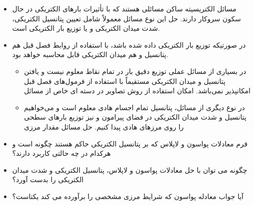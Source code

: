 \ELhold


\begin{ELunit}


\end{ELunit}

\ELhold


\begin{ELunit}

\begin{itemize}
\tightlist
\item
  مسائل الکتریسیته ساکن مسائلی هستند که با تأثیرات بارهای الکتریکی در حال سکون سروکار دارند. حل این نوع مسائل معمولاً شامل تعیین پتانسیل الکتریکی، شدت میدان الکتریکی و یا توزیع بار الکتریکی است.
\item
  در صورتیکه توزیع بار الکتریکی داده شده باشد، با استفاده از روابط فصل قبل هم پتانسیل و هم میدان الکتریکی قابل محاسبه خواهد بود.

  \begin{itemize}
  \tightlist
  \item
    در بسیاری از مسائل عملی توزیع دقیق بار در تمام نقاط معلوم نیست و یافتن پتانسیل و میدان الکتریکی مستقیماً با استفاده از فرمول‌های فصل قبل امکانپذیر نمی‌باشد. \ELim{\ELto} امکان استفاده از روش تصاویر در دسته ای خاص از مسائل
  \item
    در نوع دیگری از مسائل، پتانسیل تمام اجسام هادی معلوم است و می‌خواهیم پتانسیل و شدت میدان الکتریکی در فضای پیرامون و نیز توزیع بارهای سطحی را روی مرزهای هادی پیدا کنیم. \ELim{\ELto} حل مسائل مقدار مرزی
  \end{itemize}
\end{itemize}


\begin{itemize}
\tightlist
\item
  فرم معادلات پواسون و لاپلاس که بر پتانسیل الکتریکی حاکم هستند چگونه است و هرکدام در چه حالتی کاربرد دارند؟
\item
  چگونه می توان با حل معادلات پواسون و لاپلاس، پتانسیل الکتریکی و شدت میدان الکتریکی را بدست آورد؟
\item
  آیا جواب معادله پواسون که شرایط مرزی مشخصی را برآورده می کند یکتاست؟
\end{itemize}

\end{ELunit}

